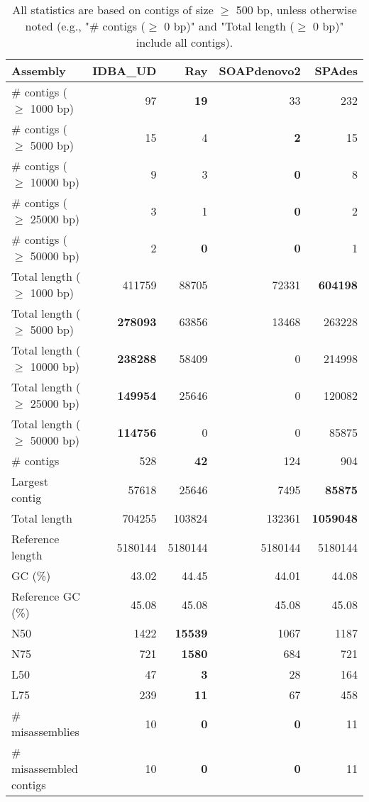 \documentclass[12pt,a4paper]{article}
\begin{document}
\begin{table}[ht]
\begin{center}
\caption{All statistics are based on contigs of size $\geq$ 500 bp, unless otherwise noted (e.g., "\# contigs ($\geq$ 0 bp)" and "Total length ($\geq$ 0 bp)" include all contigs).}
\begin{tabular}{|l*{4}{|r}|}
\hline
Assembly & IDBA\_UD & Ray & SOAPdenovo2 & SPAdes \\ \hline
\# contigs ($\geq$ 1000 bp) & 97 & {\bf 19} & 33 & 232 \\ \hline
\# contigs ($\geq$ 5000 bp) & 15 & 4 & {\bf 2} & 15 \\ \hline
\# contigs ($\geq$ 10000 bp) & 9 & 3 & {\bf 0} & 8 \\ \hline
\# contigs ($\geq$ 25000 bp) & 3 & 1 & {\bf 0} & 2 \\ \hline
\# contigs ($\geq$ 50000 bp) & 2 & {\bf 0} & {\bf 0} & 1 \\ \hline
Total length ($\geq$ 1000 bp) & 411759 & 88705 & 72331 & {\bf 604198} \\ \hline
Total length ($\geq$ 5000 bp) & {\bf 278093} & 63856 & 13468 & 263228 \\ \hline
Total length ($\geq$ 10000 bp) & {\bf 238288} & 58409 & 0 & 214998 \\ \hline
Total length ($\geq$ 25000 bp) & {\bf 149954} & 25646 & 0 & 120082 \\ \hline
Total length ($\geq$ 50000 bp) & {\bf 114756} & 0 & 0 & 85875 \\ \hline
\# contigs & 528 & {\bf 42} & 124 & 904 \\ \hline
Largest contig & 57618 & 25646 & 7495 & {\bf 85875} \\ \hline
Total length & 704255 & 103824 & 132361 & {\bf 1059048} \\ \hline
Reference length & 5180144 & 5180144 & 5180144 & 5180144 \\ \hline
GC (\%) & 43.02 & 44.45 & 44.01 & 44.08 \\ \hline
Reference GC (\%) & 45.08 & 45.08 & 45.08 & 45.08 \\ \hline
N50 & 1422 & {\bf 15539} & 1067 & 1187 \\ \hline
N75 & 721 & {\bf 1580} & 684 & 721 \\ \hline
L50 & 47 & {\bf 3} & 28 & 164 \\ \hline
L75 & 239 & {\bf 11} & 67 & 458 \\ \hline
\# misassemblies & 10 & {\bf 0} & {\bf 0} & 11 \\ \hline
\# misassembled contigs & 10 & {\bf 0} & {\bf 0} & 11 \\ \hline

\end{tabular}
\end{center}
\end{table}
\end{document}
